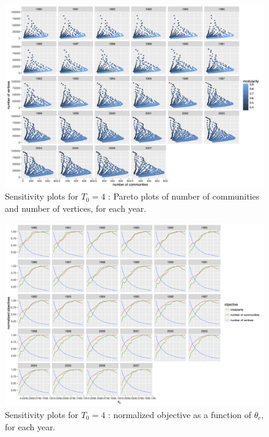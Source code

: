 \documentclass[12pt,twoside,a4paper]{article}
\begin{document}
\begin{figure}
\centering
\includegraphics[width=\textheight,height=\textwidth,angle=90]{vcount_comnum_pareto.png}
\caption{Sensitivity plots for $T_0 = 4$ : Pareto plots of number of communities and number of vertices, for each year.}
\label{fig:ext-sensitivity-2}
\end{figure}

\begin{figure}
\centering
\includegraphics[width=\textheight,height=\textwidth,angle=90]{normalizedObjs-dispth_eth4_1e-5.png}
\caption{Sensitivity plots for $T_0 = 4$ : normalized objective as a function of $\theta_c$, for each year.}
\label{fig:ext-sensitivity-3}
\end{figure}
\end{document}
